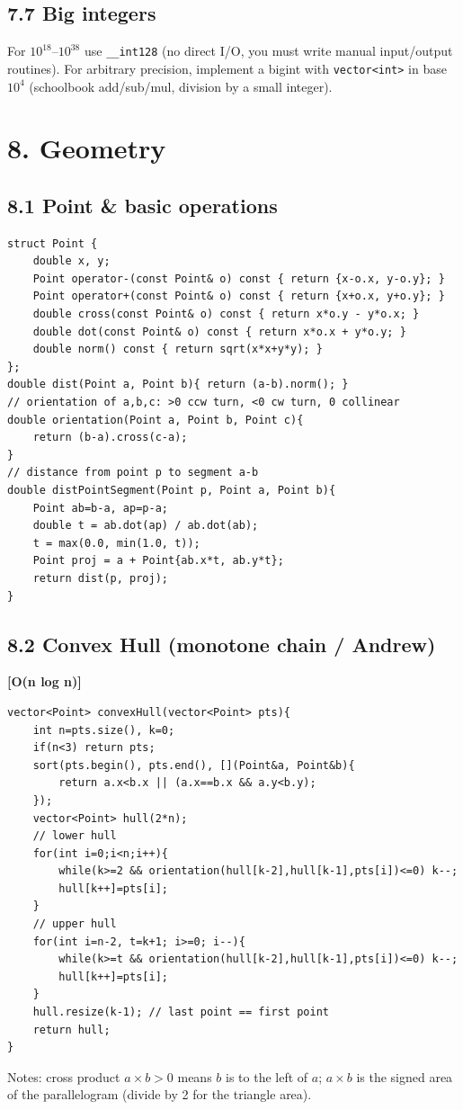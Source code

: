 \documentclass[11pt]{extarticle}
\newcommand{\comp}[1]{\textbf{[#1]}\\}
\begin{document}
\subsection*{7.7 Big integers}
For $10^{18}$--$10^{38}$ use \texttt{\_\_int128} (no direct I/O, you must
write manual input/output routines). For arbitrary precision, implement
a bigint with \texttt{vector<int>} in base $10^4$ (schoolbook add/sub/mul,
division by a small integer).

\section*{8. Geometry}
\subsection*{8.1 Point \& basic operations}
\begin{lstlisting}
struct Point {
    double x, y;
    Point operator-(const Point& o) const { return {x-o.x, y-o.y}; }
    Point operator+(const Point& o) const { return {x+o.x, y+o.y}; }
    double cross(const Point& o) const { return x*o.y - y*o.x; }
    double dot(const Point& o) const { return x*o.x + y*o.y; }
    double norm() const { return sqrt(x*x+y*y); }
};
double dist(Point a, Point b){ return (a-b).norm(); }
// orientation of a,b,c: >0 ccw turn, <0 cw turn, 0 collinear
double orientation(Point a, Point b, Point c){
    return (b-a).cross(c-a);
}
// distance from point p to segment a-b
double distPointSegment(Point p, Point a, Point b){
    Point ab=b-a, ap=p-a;
    double t = ab.dot(ap) / ab.dot(ab);
    t = max(0.0, min(1.0, t));
    Point proj = a + Point{ab.x*t, ab.y*t};
    return dist(p, proj);
}
\end{lstlisting}

\subsection*{8.2 Convex Hull (monotone chain / Andrew)}
\comp{O(n log n)}
\begin{lstlisting}
vector<Point> convexHull(vector<Point> pts){
    int n=pts.size(), k=0;
    if(n<3) return pts;
    sort(pts.begin(), pts.end(), [](Point&a, Point&b){
        return a.x<b.x || (a.x==b.x && a.y<b.y);
    });
    vector<Point> hull(2*n);
    // lower hull
    for(int i=0;i<n;i++){
        while(k>=2 && orientation(hull[k-2],hull[k-1],pts[i])<=0) k--;
        hull[k++]=pts[i];
    }
    // upper hull
    for(int i=n-2, t=k+1; i>=0; i--){
        while(k>=t && orientation(hull[k-2],hull[k-1],pts[i])<=0) k--;
        hull[k++]=pts[i];
    }
    hull.resize(k-1); // last point == first point
    return hull;
}
\end{lstlisting}
Notes: cross product $a \times b > 0$ means $b$ is to the left of $a$;
$a\times b$ is the signed area of the parallelogram (divide by 2 for
the triangle area).
\end{document}
